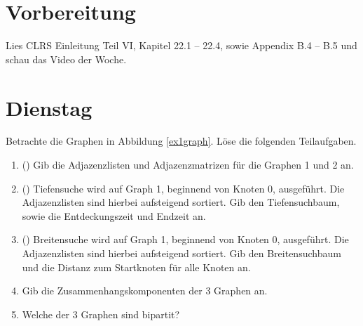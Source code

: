 \documentclass{uebung_cs}
\begin{document}
\section*{Vorbereitung}
Lies CLRS Einleitung Teil VI, Kapitel 22.1 -- 22.4, sowie Appendix B.4 -- B.5 und schau das Video der Woche.

\section*{Dienstag}
\begin{aufgabe}\label{tue-first}
	Betrachte die Graphen in Abbildung \ref{ex1graph}.
	Löse die folgenden Teilaufgaben.
	\begin{enumerate}
		\item (\warmup) Gib die Adjazenzlisten und Adjazenzmatrizen für die Graphen 1 und 2 an.
		\item (\warmup) Tiefensuche wird auf Graph 1, beginnend von Knoten 0, ausgeführt.
		Die Adjazenzlisten sind hierbei aufsteigend sortiert.
		Gib den Tiefensuchbaum, sowie die Entdeckungszeit und Endzeit an.
		\item (\warmup) Breitensuche wird auf Graph 1, beginnend von Knoten 0, ausgeführt.
		Die Adjazenzlisten sind hierbei aufsteigend sortiert.
		Gib den Breitensuchbaum und die Distanz zum Startknoten für alle Knoten an.
		\item Gib die Zusammenhangskomponenten der 3 Graphen an.
		\item Welche der 3 Graphen sind bipartit?
	\end{enumerate}
\end{aufgabe}
\end{document}
